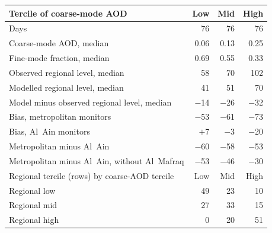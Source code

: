 \begin{tabular}{lrrr}
\toprule
Tercile of coarse-mode AOD & Low & Mid & High \\
\midrule
Days & 76 & 76 & 76 \\
Coarse-mode AOD, median & 0.06 & 0.13 & 0.25 \\
Fine-mode fraction, median & 0.69 & 0.55 & 0.33 \\
Observed regional level, median & 58 & 70 & 102 \\
Modelled regional level, median & 41 & 51 & 70 \\
Model minus observed regional level, median & $-$14 & $-$26 & $-$32 \\
Bias, metropolitan monitors & $-$53 & $-$61 & $-$73 \\
Bias, Al~Ain monitors & $+$7 & $-$3 & $-$20 \\
Metropolitan minus Al~Ain & $-$60 & $-$58 & $-$53 \\
Metropolitan minus Al~Ain, without Al~Mafraq & $-$53 & $-$46 & $-$30 \\
\midrule
Regional tercile (rows) by coarse-AOD tercile & Low & Mid & High \\
\midrule
Regional low & 49 & 23 & 10 \\
Regional mid & 27 & 33 & 15 \\
Regional high & 0 & 20 & 51 \\
\bottomrule
\end{tabular}
